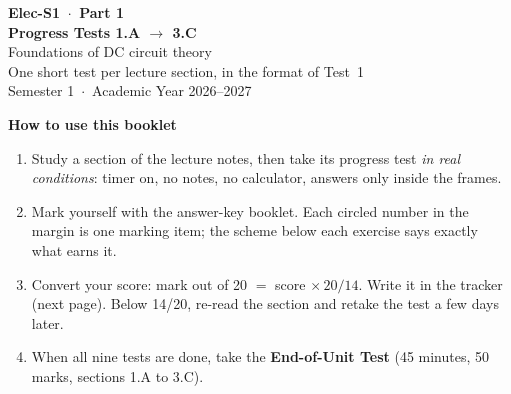 \documentclass{ibetest}
\begin{document}
\testheader
\vspace{16mm}
\begin{center}
  {\sffamily\bfseries\Huge Elec-S1 \,$\cdot$\, Part 1}\\[6pt]
  {\sffamily\bfseries\LARGE Progress Tests 1.A $\to$ 3.C}\\[8pt]
  {\large Foundations of DC circuit theory}\\[3pt]
  {\normalsize One short test per lecture section, in the format of Test~1}\\[3pt]
  {\normalsize Semester 1 \,$\cdot$\, Academic Year 2026--2027}
\end{center}
\vspace{10mm}

{\sffamily\bfseries How to use this booklet}
\begin{enumerate}[leftmargin=7mm, itemsep=3pt]
  \item Study a section of the lecture notes, then take its progress test \emph{in real
        conditions}: timer on, no notes, no calculator, answers only inside the frames.
  \item Mark yourself with the answer-key booklet. Each circled number in the margin is one
        marking item; the scheme below each exercise says exactly what earns it.
  \item Convert your score: mark out of 20 $=$ score $\times\,20/14$. Write it in the tracker
        (next page). Below 14/20, re-read the section and retake the test a few days later.
  \item When all nine tests are done, take the \textbf{End-of-Unit Test} (45 minutes,
        50 marks, sections 1.A to 3.C).
\end{enumerate}
\end{document}
